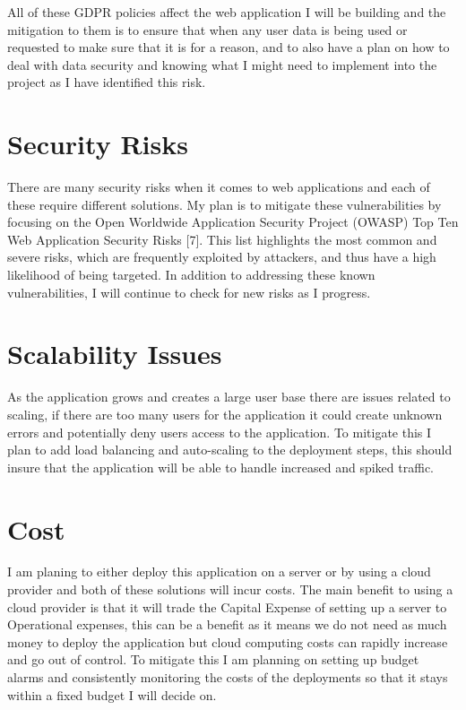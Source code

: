 \documentclass[]{project_report}
\begin{document}
All of these GDPR policies affect the web application I will be building and the mitigation to them is to ensure that when any user data is being used or requested to make sure that it is for a reason, and to also have a 
plan on how to deal with data security and knowing what I might need to implement into the project as I have identified this risk.


\section{Security Risks}

There are many security risks when it comes to web applications and each of these require different solutions. My plan is to mitigate these vulnerabilities by focusing on the Open Worldwide Application Security Project (OWASP) Top Ten Web Application Security Risks [7]. This list highlights the most common and severe risks, which are frequently exploited by attackers, and thus have a high likelihood of being targeted. In addition to addressing these known vulnerabilities, I will continue to check for new risks as I progress.


\section{Scalability Issues}

As the application grows and creates a large user base there are issues related to scaling, if there are too many users for the application it could create unknown errors and potentially deny users access to the application. To mitigate this I plan to add load balancing and auto-scaling to the deployment steps, this should insure that the application will be able to handle increased and spiked traffic.

\section{Cost}

I am planing to either deploy this application on a server or by using a cloud provider and both of these solutions will incur costs. The main benefit to using a cloud provider is that it will trade the Capital Expense of setting up a server to Operational expenses, this can be a benefit as it means we do not need as much money to deploy the application but cloud computing costs can rapidly increase and go out of control. To mitigate this I am planning on setting up budget alarms and consistently monitoring the costs of the deployments so that it stays within a fixed budget I will decide on.
\end{document}
